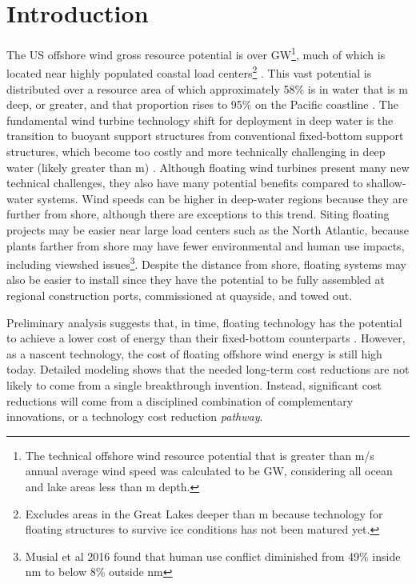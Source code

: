 \chapter{Introduction}
\label{sec:intro}

The US offshore wind gross resource potential is over
\unit[2000]{GW}\footnote{The technical offshore wind resource potential
  that is greater than \unit[7]{m/s} annual average wind speed was
  calculated to be \unit[2058]{GW}, considering all ocean and lake areas
  less than \unit[1000]{m} depth.}, much of which is located near highly
populated coastal load centers\footnote{Excludes areas in the Great
  Lakes deeper than \unit[60]{m} because technology for floating
  structures to survive ice conditions has not been matured yet.}
\citep{resource}.  This vast potential is distributed over a resource
area of which approximately 58\% is in water that is \unit[60]{m} deep,
or greater, and that proportion rises to 95\% on the Pacific coastline
\citep{musial-ca}. The fundamental wind turbine technology shift for
deployment in deep water is the transition to buoyant support structures
from conventional fixed-bottom support structures, which become too
costly and more technically challenging in deep water (likely greater
than \unit[50]{m}) \citep{obos}. Although floating wind turbines present
many new technical challenges, they also have many potential benefits
compared to shallow-water systems.  Wind speeds can be higher in
deep-water regions because they are further from shore, although there
are exceptions to this trend.  Siting floating projects may be easier
near large load centers such as the North Atlantic, because plants
farther from shore may have fewer environmental and human use impacts,
including viewshed issues\footnote{Musial et al 2016 found that human
  use conflict diminished from 49\% inside \unit[3]{nm} to below 8\%
  outside \unit[50]{nm}}.  Despite the distance from shore, floating
systems may also be easier to install since they have the potential to
be fully assembled at regional construction ports, commissioned at
quayside, and towed out.

Preliminary analysis suggests that, in time, floating technology has the
potential to achieve a lower cost of energy than their fixed-bottom
counterparts \citep{spatial}.  However, as a nascent technology, the
cost of floating offshore wind energy is still high today.  Detailed
modeling shows that the needed long-term cost reductions are not likely
to come from a single breakthrough invention.  Instead, significant cost
reductions will come from a disciplined combination of complementary
innovations, or a technology cost reduction \textit{pathway}.

